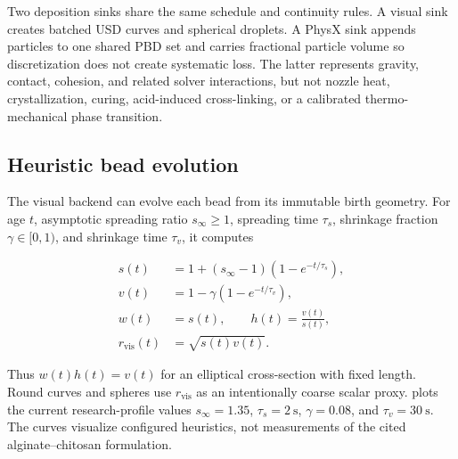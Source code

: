 \documentclass[letterpaper,10pt,conference]{ieeeconf}
\begin{document}
Two deposition sinks share the same schedule and continuity rules.  A visual
sink creates batched USD curves and spherical droplets.  A PhysX sink appends
particles to one shared PBD set and carries fractional particle volume so
discretization does not create systematic loss.  The latter represents gravity,
contact, cohesion, and related solver interactions, but not nozzle heat,
crystallization, curing, acid-induced cross-linking, or a calibrated
thermo-mechanical phase transition.

\subsection{Heuristic bead evolution}

The visual backend can evolve each bead from its immutable birth geometry.  For
age \(t\), asymptotic spreading ratio \(s_\infty\geq1\), spreading time
\(\tau_s\), shrinkage fraction \(\gamma\in[0,1)\), and shrinkage time
\(\tau_v\), it computes

\begin{align}
  s(t) &= 1+(s_\infty-1)(1-e^{-t/\tau_s}),\\
  v(t) &= 1-\gamma(1-e^{-t/\tau_v}),\\
  w(t) &= s(t),\qquad h(t)=\frac{v(t)}{s(t)},\\
  r_{\mathrm{vis}}(t) &= \sqrt{s(t)v(t)}.
  \label{eq:evolution}
\end{align}

Thus \(w(t)h(t)=v(t)\) for an elliptical cross-section with fixed length.
Round curves and spheres use \(r_{\mathrm{vis}}\) as an intentionally coarse
scalar proxy.   plots the current research-profile values
\(s_\infty=1.35\), \(\tau_s=\SI{2}{\second}\), \(\gamma=0.08\), and
\(\tau_v=\SI{30}{\second}\).  The curves visualize configured heuristics, not
measurements of the cited alginate--chitosan formulation.
\end{document}
